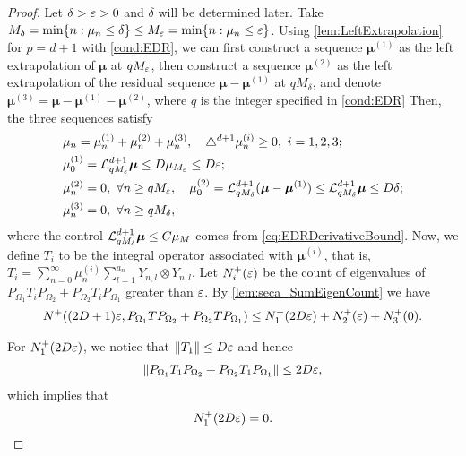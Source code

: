 \begin{proof}

  Let $\delta > \varepsilon > 0$ and $\delta$ will be determined later.
  Take $M_\delta =\min\{n : \mu_n \leq \delta\} \leq M_{\varepsilon} = \min\{n : \mu_n \leq \varepsilon\}$.
  Using \cref{lem:LeftExtrapolation} for $p = d+1$ with \cref{cond:EDR},
  we can first construct a sequence $\bm{\mu}^{(1)}$ as the left extrapolation of $\bm{\mu}$ at $qM_{\varepsilon}$,
  then construct a sequence $\bm{\mu}^{(2)}$ as the left extrapolation of the residual sequence $\bm{\mu} - \bm{\mu}^{(1)}$ at $qM_\delta$,
  and denote $\bm{\mu}^{(3)} = \bm{\mu} - \bm{\mu}^{(1)} - \bm{\mu}^{(2)}$, where $q$ is the integer specified in \cref{cond:EDR}
  Then, the three sequences satisfy
  \begin{align}
    \label{eq:C_MuDecomp}
    \begin{aligned}
      & \mu_n = \mu_n^{(1)} + \mu_n^{(2)} + \mu_n^{(3)},   \quad \triangle^{d+1}\mu_n^{(i)} \geq 0,~ i=1,2,3; \\
      & \mu_0^{(1)} = \mathcal{L}_{qM_{\varepsilon}}^{d+1} \bm{\mu} \leq D \mu_{M_{\varepsilon}} \leq D \varepsilon; \\
      &\mu_n^{(2)} = 0,~\forall n \geq qM_{\varepsilon},\quad
      \mu_0^{(2)} = \mathcal{L}_{qM_\delta}^{d+1} (\bm{\mu} - \bm{\mu}^{(1)}) \leq \mathcal{L}_{qM_\delta}^{d+1} \bm{\mu} \leq D \delta; \\
      &\mu_n^{(3)} = 0,~\forall n \geq qM_\delta,
    \end{aligned}
  \end{align}
  where the control $\mathcal{L}_{qM_{\delta}}^{d+1} \bm{\mu} \leq C \mu_M$ comes from \cref{eq:EDRDerivativeBound}.
  Now, we define $T_i$ to be the integral operator associated with $\bm{\mu}^{(i)}$, that is,
  $T_i = \sum_{n=0}^{\infty} \mu_{n}^{(i)} \sum_{l=1}^{a_n} Y_{n,l} \otimes Y_{n,l}.$
  Let $N_i^{+}(\varepsilon)$ be the count of eigenvalues of $P_{\Omega_1}T_i P_{\Omega_2}+P_{\Omega_2}T_i P_{\Omega_1}$ greater than $\varepsilon$.
  By \cref{lem:seca_SumEigenCount} we have
  \begin{align}
    \label{eq:Proof_MainLemma_N_decomp}
    N^+( (2D+1)\varepsilon, P_{\Omega_1}T P_{\Omega_2}+P_{\Omega_2}T P_{\Omega_1} )
    \leq N_1^+(2D\varepsilon) + N_2^+(\varepsilon) + N_3^+(0).
  \end{align}

  For $N_1^+(2D\varepsilon)$, we notice that $\norm{T_1} \leq D \varepsilon$ and hence
  \begin{align*}
    \norm{P_{\Omega_1}T_1 P_{\Omega_2}+P_{\Omega_2}T_1 P_{\Omega_1}} \leq 2 D \varepsilon,
  \end{align*}
  which implies that
  \begin{align}
    \label{eq:Proof_MainLemma_N1_Bound}
    N_1^+(2D\varepsilon) = 0.
  \end{align}



\end{proof}
